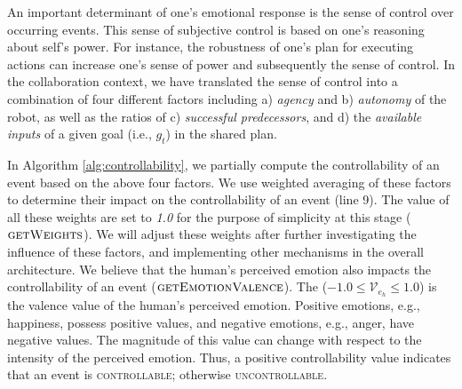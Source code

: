 \documentclass[12pt]{report}
\begin{document}
An important determinant of one's emotional response is the sense of control
over occurring events. This sense of subjective control is based on one's
reasoning about self's power. For instance, the robustness of one's plan for
executing actions can increase one's sense of power and subsequently the sense
of control. In the collaboration context, we have translated the sense of control
into a combination of four different factors including a) \textit{agency} and b)
\textit{autonomy} of the robot, as well as the ratios of c) \textit{successful
predecessors}, and d) the \textit{available inputs} of a given goal
(i.e., $\mathit{g}_{t}$) in the shared plan.

In Algorithm \ref{alg:controllability}, we partially compute the controllability
of an event based on the above four factors. We use weighted averaging of these
factors to determine their impact on the controllability of an event (line 9).
The value of all these weights are set to \textit{1.0} for the purpose of
simplicity at this stage (\textbf{$\Call{getWeights}{}$}). We will adjust these
weights after further investigating the influence of these factors, and
implementing other mechanisms in the overall architecture. We believe that the
human's perceived emotion also impacts the controllability of an event
(\textbf{$\Call{getEmotionValence}{}$}). The ($-1.0 \leq \mathcal{V}_{e_h} \leq
1.0$) is the valence value of the human's perceived emotion. Positive emotions,
e.g., happiness, possess positive values, and negative emotions, e.g., anger,
have negative values. The magnitude of this value can change with respect to the
intensity of the perceived emotion. Thus, a positive controllability value
indicates that an event is \textsc{controllable}; otherwise
\textsc{uncontrollable}.

% 
\end{document}
